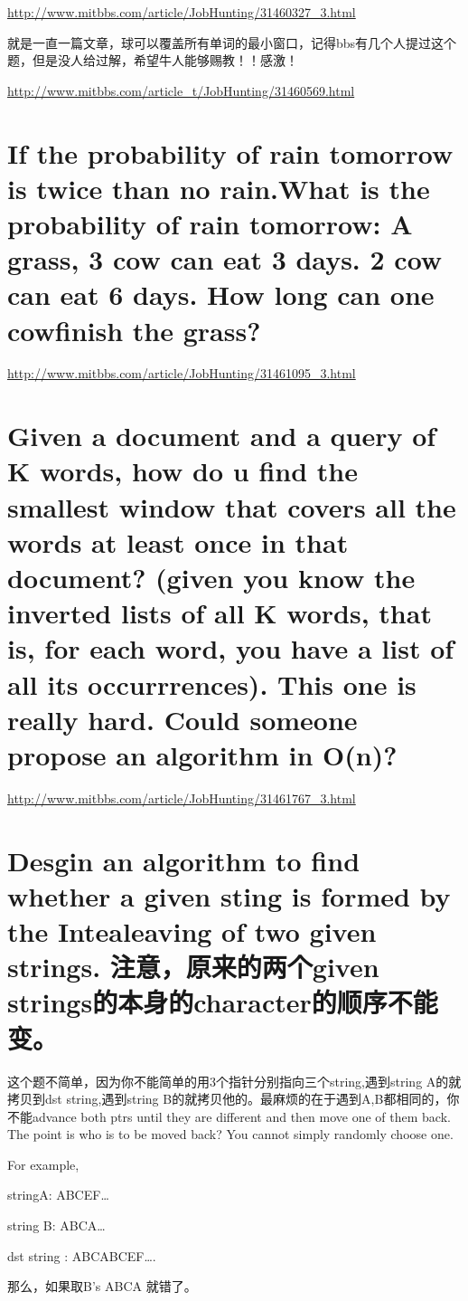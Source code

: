 \documentclass[12pt]{book}
\begin{document}
\url{http://www.mitbbs.com/article/JobHunting/31460327_3.html}

就是一直一篇文章，球可以覆盖所有单词的最小窗口，记得bbs有几个人提过这个题，但是没人给过解，希望牛人能够赐教！！感激！

\url{http://www.mitbbs.com/article_t/JobHunting/31460569.html}

\section{If the probability of rain tomorrow is twice than no rain.What is the probability of rain tomorrow: A grass, 3 cow can eat 3 days. 2 cow can eat 6 days. How long can one cowfinish the grass?}
\label{sec-13-12}

\url{http://www.mitbbs.com/article/JobHunting/31461095_3.html}

\section{Given a document and a query of K words, how do u find the smallest window that covers all the words at least once in that document? (given you know the inverted lists of all K words, that is, for each word, you have a list of all its occurrrences). This one is really hard. Could someone propose an algorithm in O(n)?}
\label{sec-13-13}

\url{http://www.mitbbs.com/article/JobHunting/31461767_3.html}

\section{Desgin an algorithm to find whether a given sting is formed by the Intealeaving of two given strings. 注意，原来的两个given strings的本身的character的顺序不能变。}
\label{sec-13-14}

这个题不简单，因为你不能简单的用3个指针分别指向三个string,遇到string A的就拷贝到dst string,遇到string B的就拷贝他的。最麻烦的在于遇到A,B都相同的，你不能advance both ptrs until they are different and then move one of them back. The point is who is to be moved back? You cannot simply randomly choose one.

For example, 

stringA: ABCEF\ldots{}

string B: ABCA\ldots{}

dst string : ABCABCEF\ldots{}.

那么，如果取B's ABCA 就错了。
\end{document}
